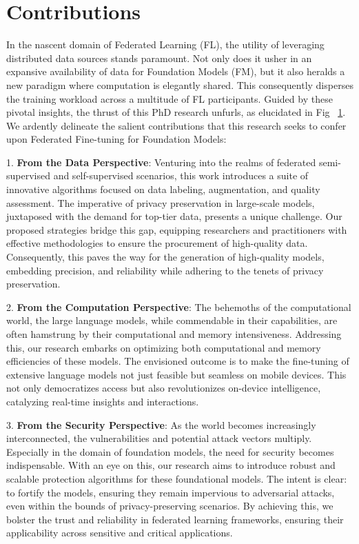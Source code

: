 \documentclass[withindex,glossary,firstyr]{cam-thesis}
\begin{document}
\section{Contributions} 
% 


In the nascent domain of Federated Learning (FL), the utility of leveraging distributed data sources stands paramount. Not only does it usher in an expansive availability of data for Foundation Models (FM), but it also heralds a new paradigm where computation is elegantly shared. This consequently disperses the training workload across a multitude of FL participants. Guided by these pivotal insights, the thrust of this PhD research unfurls, as elucidated in Fig ~\ref{}. We ardently delineate the salient contributions that this research seeks to confer upon Federated Fine-tuning for Foundation Models:

1. \textbf{From the Data Perspective}: Venturing into the realms of federated semi-supervised and self-supervised scenarios, this work introduces a suite of innovative algorithms focused on data labeling, augmentation, and quality assessment. The imperative of privacy preservation in large-scale models, juxtaposed with the demand for top-tier data, presents a unique challenge. Our proposed strategies bridge this gap, equipping researchers and practitioners with effective methodologies to ensure the procurement of high-quality data. Consequently, this paves the way for the generation of high-quality models, embedding precision, and reliability while adhering to the tenets of privacy preservation.

2. \textbf{From the Computation Perspective}: The behemoths of the computational world, the large language models, while commendable in their capabilities, are often hamstrung by their computational and memory intensiveness. Addressing this, our research embarks on optimizing both computational and memory efficiencies of these models. The envisioned outcome is to make the fine-tuning of extensive language models not just feasible but seamless on mobile devices. This not only democratizes access but also revolutionizes on-device intelligence, catalyzing real-time insights and interactions.

3. \textbf{From the Security Perspective}: As the world becomes increasingly interconnected, the vulnerabilities and potential attack vectors multiply. Especially in the domain of foundation models, the need for security becomes indispensable. With an eye on this, our research aims to introduce robust and scalable protection algorithms for these foundational models. The intent is clear: to fortify the models, ensuring they remain impervious to adversarial attacks, even within the bounds of privacy-preserving scenarios. By achieving this, we bolster the trust and reliability in federated learning frameworks, ensuring their applicability across sensitive and critical applications.
\end{document}
